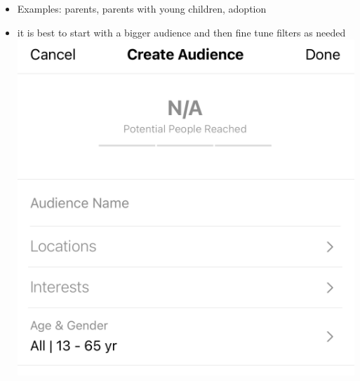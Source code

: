 \documentclass[]{book}
\begin{document}
\begin{itemize}
\item
  Examples: parents, parents with young children, adoption
\item
  it is best to start with a bigger audience and then fine tune filters as needed
  \includegraphics{images/lab_protocols/ig_ads/4.png}
\end{itemize}
\end{document}
